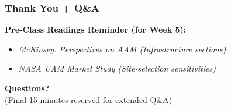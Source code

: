 \documentclass{beamer}
\begin{document}
\begin{frame}[t]
  \frametitle{Thank You + Q\&A}
  
  \textbf{Pre-Class Readings Reminder (for Week 5):}
  \begin{itemize}
      \item \textit{McKinsey: Perspectives on AAM (Infrastructure sections)}
      \item \textit{NASA UAM Market Study (Site-selection sensitivities)}
  \end{itemize}
  
  \vspace{1cm}
  \begin{center}
      \textbf{Questions?} \\
      \small (Final 15 minutes reserved for extended Q\&A)
  \end{center}
\end{frame}
\end{document}
